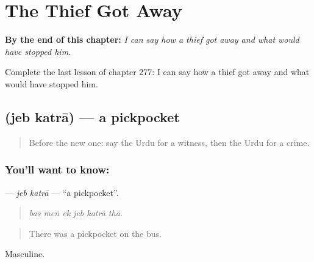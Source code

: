 
\chapter{The Thief Got Away}
\label{ch:ur-the-thief-got-away}

\begin{chapteropening}
\textbf{By the end of this chapter:} \emph{I can say how a thief got away and what would have stopped him.}

Complete the last lesson of chapter 277: I can say how a thief got away and what would have stopped him.
\end{chapteropening}

\section[\texorpdfstring{\ur{جیب} \ur{کترا} (jeb katrā)}{جیب کترا (jeb katrā)}]{  (jeb katrā) — a pickpocket}

\label{lesson:UR-C277-jeb-katra}



\begin{quote}
Before the new one: say the Urdu for a witness, then the Urdu for a crime.
\end{quote}

\subsection*{You'll want to know:  }
\textbf{ } — \emph{jeb katrā} — \textquotedblleft{}a pickpocket\textquotedblright{}.

\begin{quote}
     
\end{quote}

\begin{quote}
\emph{bas meṅ ek jeb katrā thā.}
\end{quote}

\begin{quote}
There was a pickpocket on the bus.
\end{quote}

Masculine.

